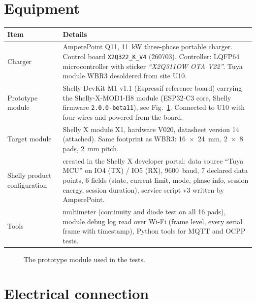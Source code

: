 \documentclass[11pt,a4paper]{article}
\begin{document}
\section{Equipment}

\begin{longtable}{>{\raggedright\arraybackslash}p{3.2cm}>{\raggedright\arraybackslash}p{12.9cm}}
\toprule
\rowcolor{aphead}\textbf{Item} & \textbf{Details} \\
\midrule\endhead
\bottomrule\endfoot
Charger & AmperePoint Q11, 11~kW three-phase portable charger. Control board \texttt{X2Q322\_K\_V4} (260703). Controller: LQFP64 microcontroller with sticker \emph{``X2Q311OW OTA V22''}. Tuya module WBR3 desoldered from site U10. \\
Prototype module & Shelly DevKit M1 v1.1 (Espressif reference board) carrying the Shelly-X-MOD1-H8 module (ESP32-C3 core, Shelly firmware \texttt{2.0.0-beta11}), see Fig.~\ref{fig:devkit}. Connected to U10 with four wires and powered from the board. \\
Target module & Shelly X module X1, hardware V020, datasheet version 14 (attached). Same footprint as WBR3: 16~$\times$~24~mm, 2~$\times$~8 pads, 2~mm pitch. \\
Shelly product configuration & created in the Shelly X developer portal: data source ``Tuya MCU'' on IO4 (TX) / IO5 (RX), 9600~baud, 7 declared data points, 6 fields (state, current limit, mode, phase info, session energy, session duration), service script v3 written by AmperePoint. \\
Tools & multimeter (continuity and diode test on all 16 pads), module debug log read over Wi-Fi (frame level, every serial frame with timestamp), Python tools for MQTT and OCPP tests. \\
\end{longtable}

\begin{figure}[H]
\centering
{}\hspace{0.6cm}
\caption{The prototype module used in the tests.}
\label{fig:devkit}
\end{figure}

\section{Electrical connection}
\end{document}
